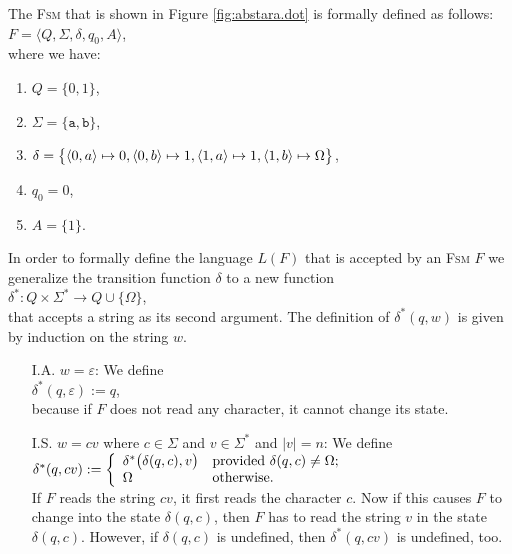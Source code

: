 \exampleEng
The \textsc{Fsm} that is shown in Figure  \ref{fig:abstara.dot} is formally defined as follows:
\\[0.2cm]
\hspace*{1.3cm}
$F = \langle Q, \Sigma, \delta, q_0, A \rangle$,
\\[0.2cm]
where we have:
\begin{enumerate}
\item $Q = \{ 0, 1 \}$,
\item $\Sigma = \{ \texttt{a}, \texttt{b} \}$,
\item $\delta = \bigl\{ 
                        \pair(0,a) \mapsto 0, 
                        \pair(0,b) \mapsto 1, 
                        \pair(1,a) \mapsto 1, 
                        \pair(1,b) \mapsto \Omega 
                \bigr\}$,
\item $q_0 = 0$,
\item $A = \{ 1 \}$.
\end{enumerate}
In order to formally define the language $L(F)$ that is accepted by an \textsc{Fsm} $F$
we generalize the transition function $\delta$ to a new function
\\[0.2cm]
\hspace*{1.3cm}
$\delta^*: Q \times \Sigma^* \rightarrow Q \cup \{ \Omega \}$,
\\[0.2cm]
that accepts a string as its second argument.  The definition of
$\delta^*(q, w)$ is given by induction on the string $w$.
\begin{enumerate}
\item[I.A.] $w = \varepsilon$:  We define
            \\[0.2cm]
            \hspace*{1.3cm}
            $\delta^*(q, \varepsilon) := q$,
            \\[0.2cm]
            because if $F$ does not read any character, it cannot change its state. 
\item[I.S.] $w = cv$ where $c \in \Sigma$ and $v  \in \Sigma^*$ and $|v| = n$:  We define
            \\[0.2cm]
            \hspace*{1.3cm}
            $\delta^*(q, cv) := \left\{
            \begin{array}[c]{ll}              
            \delta^*\bigl(\delta(q,c),v\bigr) & \mbox{provided $\delta(q,c) \not= \Omega$;} \\
            \Omega                            & \mbox{otherwise}.
            \end{array}
            \right.
            $
            \\[0.2cm]
            If $F$ reads the string  $cv$, it first reads the character $c$.  Now if this causes  $F$
            to change into the state $\delta(q,c)$, then $F$ has to read the string $v$ in the state
            $\delta(q,c)$.  However, 
            if  $\delta(q,c)$ is undefined, then  $\delta^*(q,cv)$ is undefined, too.
\end{enumerate}

